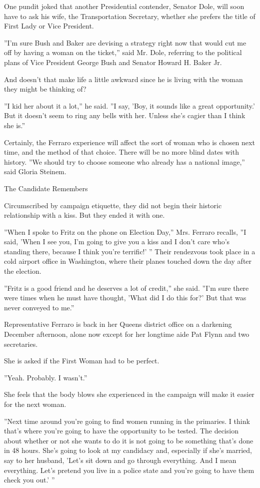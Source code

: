 One pundit joked that another Presidential contender, Senator Dole, will
soon have to ask his wife, the Transportation Secretary, whether she
prefers the title of First Lady or Vice President.

''I'm sure Bush and Baker are devising a strategy right now that would
cut me off by having a woman on the ticket,'' said Mr. Dole, referring
to the political plans of Vice President George Bush and Senator Howard
H. Baker Jr.

And doesn't that make life a little awkward since he is living with the
woman they might be thinking of?

''I kid her about it a lot,'' he said. ''I say, 'Boy, it sounds like a
great opportunity.' But it doesn't seem to ring any bells with her.
Unless she's cagier than I think she is.''

Certainly, the Ferraro experience will affect the sort of woman who is
chosen next time, and the method of that choice. There will be no more
blind dates with history. ''We should try to choose someone who already
has a national image,'' said Gloria Steinem.

The Candidate Remembers

Circumscribed by campaign etiquette, they did not begin their historic
relationship with a kiss. But they ended it with one.

''When I spoke to Fritz on the phone on Election Day,'' Mrs. Ferraro
recalls, ''I said, 'When I see you, I'm going to give you a kiss and I
don't care who's standing there, because I think you're terrific!' ''
Their rendezvous took place in a cold airport office in Washington,
where their planes touched down the day after the election.

''Fritz is a good friend and he deserves a lot of credit,'' she said.
''I'm sure there were times when he must have thought, 'What did I do
this for?' But that was never conveyed to me.''

Representative Ferraro is back in her Queens district office on a
darkening December afternoon, alone now except for her longtime aide Pat
Flynn and two secretaries.

She is asked if the First Woman had to be perfect.

''Yeah. Probably. I wasn't.''

She feels that the body blows she experienced in the campaign will make
it easier for the next woman.

''Next time around you're going to find women running in the primaries.
I think that's where you're going to have the opportunity to be tested.
The decision about whether or not she wants to do it is not going to be
something that's done in 48 hours. She's going to look at my candidacy
and, especially if she's married, say to her husband, 'Let's sit down
and go through everything. And I mean everything. Let's pretend you live
in a police state and you're going to have them check you out.' ''

